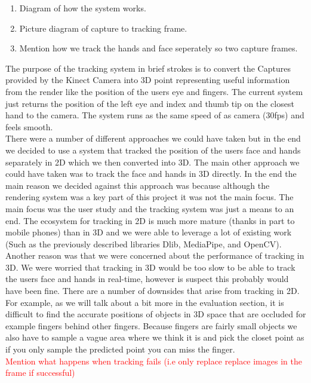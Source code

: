 \begin{enumerate}[itemsep=-0.25em]
	\item Diagram of how the system works.
	\item Picture diagram of capture to tracking frame.
	\item Mention how we track the hands and face seperately so two capture frames.  
\end{enumerate}

The purpose of the tracking system in brief strokes is to convert the Captures provided by the Kinect Camera into 3D point representing useful information from the render like the position of the users eye and fingers. The current system just returns the position of the left eye and index and thumb tip on the closest hand to the camera. The system runs as the same speed of as camera (30fps) and feels smooth. \\

There were a number of different approaches we could have taken but in the end we decided to use a system that tracked the position of the users face and hands separately in 2D which we then converted into 3D. The main other approach we could have taken was to track the face and hands in 3D directly. In the end the main reason we decided against this approach was because although the rendering system was a key part of this project it was not the main focus. The main focus was the user study and the tracking system was just a means to an end. The ecosystem for tracking in 2D is much more mature (thanks in part to mobile phones) than in 3D and we were able to leverage a lot of existing work (Such as the previously described libraries Dlib, MediaPipe, and OpenCV). Another reason was that we were concerned about the performance of tracking in 3D. We were worried that tracking in 3D would be too slow to be able to track the users face and hands in real-time, however is suspect this probably would have been fine. There are a number of downsides that arise from tracking in 2D. For example, as we will talk about a bit more in the evaluation section, it is difficult to find the accurate positions of objects in 3D space that are occluded for example fingers behind other fingers. Because fingers are fairly small objects we also have to sample a vague area where we think it is and pick the closet point as if you only sample the predicted point you can miss the finger.\\

\textcolor{red}{Mention what happens when tracking fails (i.e only replace replace images in the frame if successful)}

